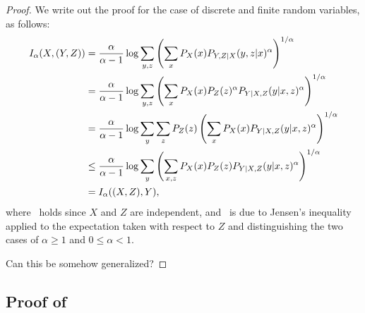 \documentclass{article}
\numberwithin{theorem}{section}
\numberwithin{example}{section}
\numberwithin{remark}{section}
\numberwithin{definition}{section}
\newcommand{\revised}[1]{{\color{black} #1}}
\begin{document}
\begin{proof}
We write out the proof for the case of discrete and finite random variables, as follows:
    \begin{align}
        I_\alpha(X, (Y,Z)) &= \frac{\alpha}{\alpha-1} \log \sum_{y,z} \left( \sum_{x}P_X(x) P_{Y,Z|X}(y,z|x)^\alpha \right)^{1/\alpha} \\
          &= \frac{\alpha}{\alpha-1} \log \sum_{y,z} \left( \sum_{x} P_X(x) P_Z(z)^\alpha P_{Y|X,Z}(y|x,z)^\alpha \right)^{1/\alpha} \label{app:proof:thm:Riouletal:eq:ind} \\
          &= \frac{\alpha}{\alpha-1} \log \sum_{y} \sum_z P_Z(z) \left( \sum_{x} P_X(x)  P_{Y|X,Z}(y|x,z)^\alpha \right)^{1/\alpha} \\
          & \le \frac{\alpha}{\alpha-1} \log \sum_{y} \left( \sum_{x,z} P_X(x) P_Z(z) P_{Y|X,Z}(y|x,z)^\alpha \right)^{1/\alpha} \label{app:proof:thm:Riouletal:eq:jensen}\\
          & = \revised{I_\alpha((X,Z), Y)},
    \end{align}
    where~ holds since $X$ and $Z$ are independent, and~ is due to Jensen's inequality applied to the expectation taken with respect to $Z$ and distinguishing the two cases of $\alpha\ge 1$ and $0 \le \alpha < 1$.



    Can this be somehow generalized?

    
\end{proof}


\subsection{Proof of~}\label{app:proof:thm:tensorization}
\end{document}
